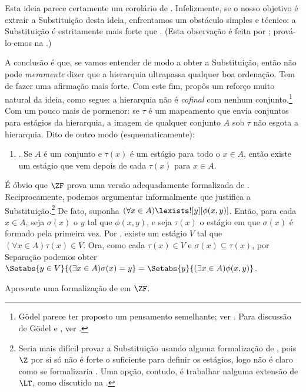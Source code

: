 \documentclass[../../../include/open-logic-section]{subfiles}
\begin{document}
Esta ideia parece certamente um corolário de \stagesinex.
Infelizmente, se o nosso objetivo é extrair a Substituição desta ideia,
enfrentamos um obstáculo simples e técnico: a Substituição é estritamente mais forte que
. (Esta observação é feita por 
\citet[\S13.2]{Potter2004}; prová-lo-emos na .)

A conclusão é que, se vamos entender \stagesinex{} de
modo a obter a Substituição, então não pode \emph{meramente} dizer
que a hierarquia ultrapassa qualquer boa ordenação. Tem de fazer uma afirmação
mais forte. Com este fim, \cite{Shoenfield:AST} propôs um
reforço muito natural da ideia, como segue: a hierarquia não é
\emph{cofinal} com nenhum conjunto.\footnote{G\"odel parece ter proposto um
pensamento semelhante; ver \citet[p.~223]{Potter2004}. Para discussão de G\"odel e \citeauthor{Shoenfield:AST}, ver \citet[90--5]{Incurvati2020}.} Com um pouco mais de pormenor:
se $\tau$ é um mapeamento que envia conjuntos para estágios da hierarquia,
a imagem de qualquer conjunto $A$ sob $\tau$ não esgota a hierarquia.
Dito de outro modo (esquematicamente): 
\begin{enumerate}
	\item[] \stagescofin. Se $A$ é um conjunto e $\tau(x)$ é um estágio para
	todo o $x \in A$, então existe um estágio que vem depois de cada
	$\tau(x)$ para $x \in A$.
\end{enumerate}
É óbvio que $\ZF$ prova uma versão adequadamente formalizada de
\stagescofin. Reciprocamente, podemos argumentar informalmente que \stagescofin{}
justifica a Substituição.\footnote{Seria mais difícil provar a
Substituição usando alguma formalização de \stagescofin, pois $\Z$ por
si só não é forte o suficiente para definir os estágios, logo não é claro
como se formalizaria \stagescofin. Uma opção, contudo, é
trabalhar nalguma extensão de $\LT$, como discutido na .} De fato, suponha $(\forall x \in A)\lexists![y][\phi(x,y)]$. Então, para cada $x \in A$, seja $\sigma(x)$ o $y$ tal
que $\phi(x,y)$, e seja $\tau(x)$ o estágio em que $\sigma(x)$ é
formado pela primeira vez. Por \stagescofin, existe um estágio $V$ tal que
$(\forall x \in A)\tau(x)\in V$. Ora, como cada $\tau(x) \in V$ e
$\sigma(x) \subseteq \tau(x)$, por Separação podemos obter $\Setabs{y
\in V}{(\exists x \in A)\sigma(x) = y} = \Setabs{y}{(\exists x \in
A)\phi(x,y)}$.

\begin{prob}
	Apresente uma formalização de \stagescofin{} em $\ZF$.
\end{prob}
\end{document}
